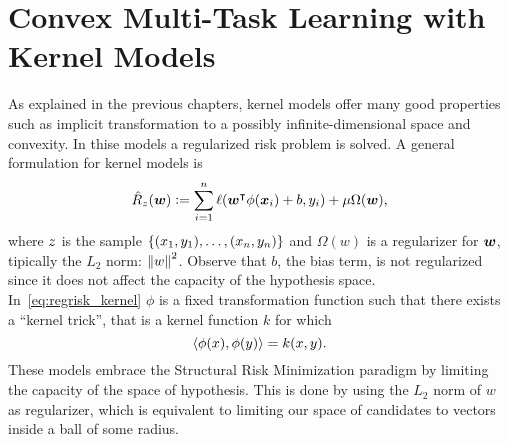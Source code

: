 \section{Convex Multi-Task Learning with Kernel Models}
As explained in the previous chapters, kernel models offer many good properties such as implicit transformation to a possibly infinite-dimensional space and convexity. In thise models a regularized risk problem is solved.
A general formulation for kernel models is 
\begin{equation}
    \label{eq:regrisk_kernel}
    \emprisk(\fv{w}) \defeq \sum_{i=1}^{\nsamples} \lossf(\fv{w}^\intercal {\phi(\fv{x}_i)}+ b, y_i) + \mu \Omega(\fv{w}) ,
\end{equation}
where $z$ is the sample $\{(x_1, y_1), \ldots, (x_n, y_n)\}$ and $\Omega(w)$ is a regularizer for $\bm{w}$, tipically the $L_2$ norm: $\left\lVert w\right\rVert^2$. Observe that $b$, the bias term, is not regularized since it does not affect the capacity of the hypothesis space.
In~\eqref{eq:regrisk_kernel} $\phi$ is a fixed transformation function such that there exists a ``kernel trick'', that is a kernel function $k$ for which
\begin{equation}
    \nonumber
    \left\langle \phi(x), \phi(y) \right\rangle = k(x, y).
\end{equation}
These models embrace the Structural Risk Minimization paradigm by limiting the capacity of the space of hypothesis. This is done by using the $L_2$ norm of $w$ as regularizer, which is equivalent to limiting our space of candidates to vectors inside a ball of some radius.

